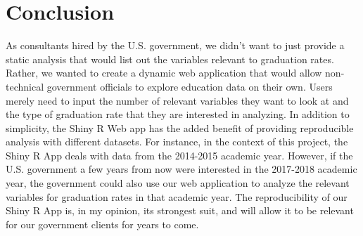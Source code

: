 \documentclass{article}
\begin{document}
\section{Conclusion}
As consultants hired by the U.S. government, we didn't want to just provide a static analysis that would list out the variables relevant to graduation rates. Rather, we wanted to create a dynamic web application that would allow non-technical government officials to explore education data on their own. Users merely need to input the number of relevant variables they want to look at and the type of graduation rate that they are interested in analyzing. In addition to simplicity, the Shiny R Web app has the added benefit of providing reproducible analysis with different datasets. For instance, in the context of this project, the Shiny R App deals with data from the 2014-2015 academic year. However, if the U.S. government a few years from now were interested in the 2017-2018 academic year, the government could also use our web application to analyze the relevant variables for graduation rates in that academic year. The reproducibility of our Shiny R App is, in my opinion, its strongest suit, and will allow it to be relevant for our government clients for years to come.
\end{document}
